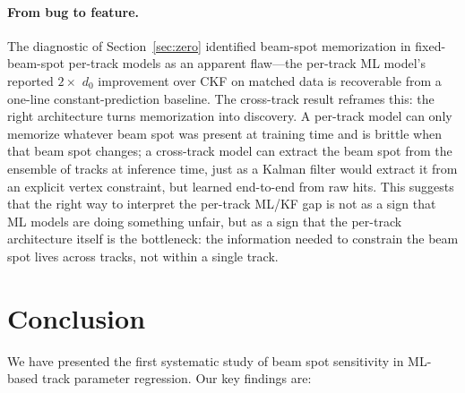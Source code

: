 \documentclass[11pt]{article}
\begin{document}
\paragraph{From bug to feature.}
The diagnostic of Section~\ref{sec:zero} identified beam-spot memorization in fixed-beam-spot per-track models as an apparent flaw---the per-track ML model's reported $2\times$ $d_0$ improvement over CKF on matched data is recoverable from a one-line constant-prediction baseline.
The cross-track result reframes this: the right architecture turns memorization into discovery.
A per-track model can only memorize whatever beam spot was present at training time and is brittle when that beam spot changes; a cross-track model can extract the beam spot from the ensemble of tracks at inference time, just as a Kalman filter would extract it from an explicit vertex constraint, but learned end-to-end from raw hits.
This suggests that the right way to interpret the per-track ML/KF gap is not as a sign that ML models are doing something unfair, but as a sign that the per-track architecture itself is the bottleneck: the information needed to constrain the beam spot lives across tracks, not within a single track.

\section{Conclusion}
\label{sec:conclusion}

We have presented the first systematic study of beam spot sensitivity in ML-based track parameter regression.
Our key findings are:
\end{document}

